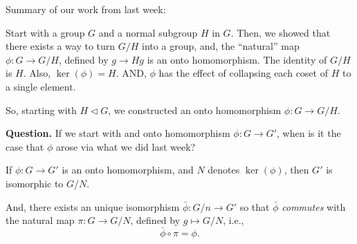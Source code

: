 
Summary of our work from last week:

Start with a group $G$ and a normal subgroup $H$ in $G$. Then, we showed that there exists a way to turn $G/H$ into a group, and, the ``natural'' map $\phi: G \to G/H$, defined by $g \to Hg$ is an onto homomorphism. The identity of  $G/H$ is $H$. Also,  $\ker(\phi) = H$. AND, $\phi$ has the effect of collapsing each coset of  $H$ to a single element.

So, starting with $H \vartriangleleft G$, we constructed an onto homomorphism $\phi: G \to G/H$.

\noindent \textbf{Question.} If we start with and onto homomorphism  $\phi: G \to G'$, when is it the case that $\phi$ arose via what we did last week?

\begin{thm}
	If $\phi: G \to G'$ is an onto homomorphism, and $N$ denotes $\ker(\phi)$, then  $G'$ is isomorphic to $G/N$.

And, there exists an unique isomorphism $\bar\phi: G/n \to G'$ so that  $\bar\phi$ \emph{commutes} with the natural map  $\pi: G \to G/N$, defined by $g \mapsto G/N$, i.e.,  \[\bar\phi \circ \pi = \phi.\]
\end{thm}

